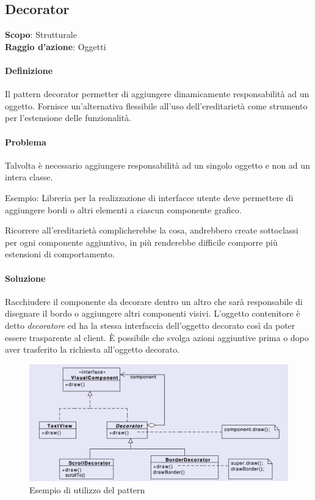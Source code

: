 \subsection{Decorator}
\label{decorator}

\textbf{Scopo}: Strutturale \\
\textbf{Raggio d'azione}: Oggetti

\paragraph{Definizione} Il pattern decorator permetter di aggiungere dinamicamente responsabilità ad un oggetto. Fornisce un'alternativa flessibile all'uso dell'ereditarietà come strumento per l'estensione delle funzionalità.

\paragraph{Problema} Talvolta è necessario aggiungere responsabilità ad un singolo oggetto e non ad un intera classe.

Esempio: Libreria per la realizzazione di interfacce utente deve permettere di aggiungere bordi o altri elementi a ciascun componente grafico.

Ricorrere all'ereditarietà complicherebbe la cosa, andrebbero create sottoclassi per ogni componente aggiuntivo, in più renderebbe difficile comporre più estensioni di comportamento.

\paragraph{Soluzione} Racchiudere il componente da decorare dentro un altro che sarà responsabile di disegnare il bordo o aggiungere altri componenti visivi. L'oggetto contenitore è detto \textit{decoratore} ed ha la stessa interfaccia dell'oggetto decorato così da poter essere trasparente al client. È possibile che svolga azioni aggiuntive prima o dopo aver trasferito la richiesta all'oggetto decorato.

\begin{figure}[H]
    \centering
    \includegraphics[width=1\linewidth]{assets/pattern/decorator/decorator-esempio.png}
    \caption{Esempio di utilizzo del pattern}
\end{figure}


